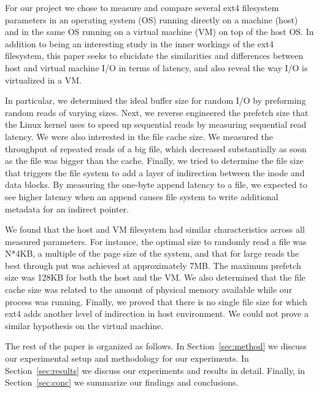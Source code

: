 For our project we chose to measure and compare several ext4 filesystem parameters
in an operating system (OS) running directly on a machine (host) and in the same 
OS running on a virtual machine (VM) on top of the host OS. In addition to being an 
interesting study in the inner workings of the ext4 filesystem, this paper seeks to
elucidate the similarities and differences between host and virtual machine I/O in
terms of latency, and also reveal the way I/O is virtualized in a VM.

In particular, we determined the ideal buffer size for random I/O by preforming random reads
of varying sizes. Next, we reverse engineered the prefetch size that the Linux kernel uses to speed up
sequential reads by measuring sequential read latency. We were also interested in the file cache size.
We measured the throughput of repeated reads of a big file, which decreased substantially as soon
as the file was bigger than the cache. Finally, we tried to determine the file size that triggers the
file system to add a layer of indirection between the inode and data blocks. By measuring the one-byte
append latency to a file, we expected to see higher latency when an append causes file system
to write additional metadata for an indirect pointer.

We found that the host and VM filesystem had similar characteristics across all measured parameters. For instance, the 
optimal size to randomly read a file was N*4KB, a multiple of the page size of the 
system, and that for large reads the best through put was achieved at approximately
7MB. The maximum prefetch size was 128KB for both the host and the VM. We also 
determined that the file cache size was related to the amount of physical memory 
available while our process was running. Finally, we proved that there is no single file
size for which ext4 adds another level of indirection in host environment. We could not prove a
similar hypothesis on the virtual machine.

The rest of the paper is organized as follows. In Section~\ref{sec:method} we 
discuss our experimental setup and methodology for our experiments. In 
Section~\ref{sec:results} we discuss our experiments and results in detail. 
Finally, in Section~\ref{sec:conc} we summarize our findings and conclusions.

